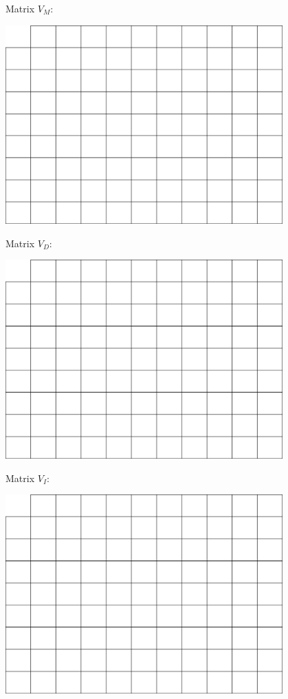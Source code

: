 \documentclass[a4paper,11pt]{article}
\begin{document}
\newpage

Matrix $V_M$:
\begin{center}
\includegraphics[width=0.8\textwidth]{matrix.png}
\end{center}
\vspace{1.5cm}

Matrix $V_D$:
\begin{center}
\includegraphics[width=0.8\textwidth]{matrix.png}
\end{center}
\vspace{1.5cm}

\newpage 

Matrix $V_I$: 
\begin{center}
\includegraphics[width=0.8\textwidth]{matrix.png}
\end{center}
\vspace{0.5cm}
\end{document}
